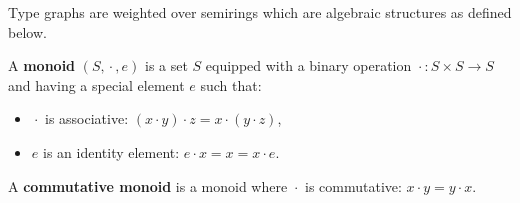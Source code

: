 Type graphs are weighted over semirings which are algebraic structures as defined below.
\begin{definition} 
    A \textbf{monoid} $(S, \mathop{\cdot}, e)$ is a set $S$ equipped with a binary operation $\mathop{\cdot} : S \mathop{\times} S \mathop{\rightarrow} S$ and having a special element $e$ such that:
    \begin{itemize}
        \item {$\mathop{\cdot}$ is associative:} $ (x \mathop{\cdot} y) \mathop{\cdot} z \mathop{=} x \mathop{\cdot} (y \mathop{\cdot} z)$,
        \item {$e$ is an identity element:} $  e \mathop{\cdot} x \mathop{=} x \mathop{=} x \mathop{\cdot} e$.
    \end{itemize}
    A \textbf{commutative monoid} is a monoid where $\mathop{\cdot}$ is commutative: $x \mathop{\cdot} y \mathop{=} y \mathop{\cdot} x$.
\end{definition}

